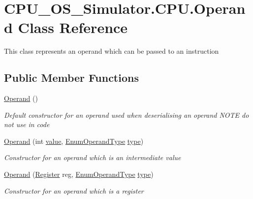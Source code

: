 \hypertarget{class_c_p_u___o_s___simulator_1_1_c_p_u_1_1_operand}{}\section{C\+P\+U\+\_\+\+O\+S\+\_\+\+Simulator.\+C\+P\+U.\+Operand Class Reference}
\label{class_c_p_u___o_s___simulator_1_1_c_p_u_1_1_operand}


This class represents an operand which can be passed to an instruction  


\subsection*{Public Member Functions}
\begin{DoxyCompactItemize}
\item 
\hyperlink{class_c_p_u___o_s___simulator_1_1_c_p_u_1_1_operand_a8f6d642c2e5741c17748379c34a3052c}{Operand} ()
\begin{DoxyCompactList}\small\item\em Default constructor for an operand used when deserialising an operand N\+O\+T\+E do not use in code \end{DoxyCompactList}\item 
\hyperlink{class_c_p_u___o_s___simulator_1_1_c_p_u_1_1_operand_aaa8877bd8c0018697f49c9f764fbe750}{Operand} (int \hyperlink{class_c_p_u___o_s___simulator_1_1_c_p_u_1_1_operand_a59d05c39a45091805c9506b1852f9bde}{value}, \hyperlink{namespace_c_p_u___o_s___simulator_1_1_c_p_u_ad49cfe442b74115a326c03b7ae848f76}{Enum\+Operand\+Type} \hyperlink{class_c_p_u___o_s___simulator_1_1_c_p_u_1_1_operand_abc8f504a22e9a5c49d91b12f61cc5119}{type})
\begin{DoxyCompactList}\small\item\em Constructor for an operand which is an intermediate value \end{DoxyCompactList}\item 
\hyperlink{class_c_p_u___o_s___simulator_1_1_c_p_u_1_1_operand_ab1da49c3f7978edcfa8c9b95e5804f08}{Operand} (\hyperlink{class_c_p_u___o_s___simulator_1_1_c_p_u_1_1_register}{Register} reg, \hyperlink{namespace_c_p_u___o_s___simulator_1_1_c_p_u_ad49cfe442b74115a326c03b7ae848f76}{Enum\+Operand\+Type} \hyperlink{class_c_p_u___o_s___simulator_1_1_c_p_u_1_1_operand_abc8f504a22e9a5c49d91b12f61cc5119}{type})
\begin{DoxyCompactList}\small\item\em Constructor for an operand which is a register \end{DoxyCompactList}\end{DoxyCompactItemize}
